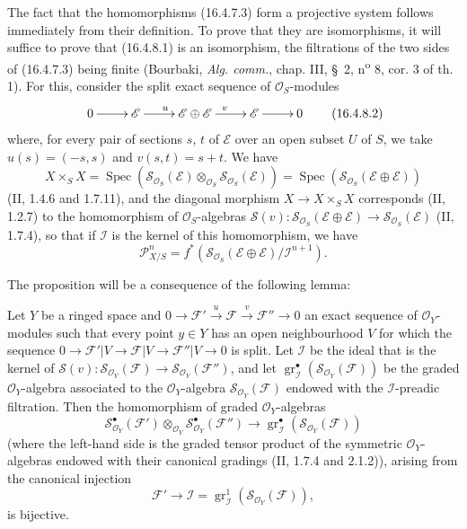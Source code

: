 The fact that the homomorphisms (16.4.7.3) form a projective system follows
immediately from their definition. To prove that they are isomorphisms, it
will suffice to
prove that (16.4.8.1) is an isomorphism, the filtrations of the two sides of
(16.4.7.3) being finite (Bourbaki, \emph{Alg. comm.}, chap. III, \S~2,
n\textsuperscript{o} 8, cor. 3 of th. 1). For this, consider the split exact
sequence of $\mathcal{O}_S$-modules
\[
  \xymatrix{
    0 \ar[r] & \mathscr{E} \ar[r]^{u} &
    \mathscr{E}\oplus\mathscr{E} \ar[r]^{v} &
    \mathscr{E} \ar[r] & 0
  }
  \tag{16.4.8.2}
  \label{IV.16.4.8.2}
\]
where, for every pair of sections $s$, $t$ of $\mathscr{E}$ over an open subset
$U$ of $S$, we take $u(s)=(-s,s)$ and $v(s,t)=s+t$. We have
\[
  X\times_S X=\operatorname{Spec}
  (\mathscr{S}_{\mathcal{O}_S}(\mathscr{E})\otimes_{\mathcal{O}_S}
  \mathscr{S}_{\mathcal{O}_S}(\mathscr{E}))
  =\operatorname{Spec}(\mathscr{S}_{\mathcal{O}_S}
  (\mathscr{E}\oplus\mathscr{E}))
\]
(II, 1.4.6 and 1.7.11), and the diagonal morphism $X\to X\times_S X$ corresponds
(II, 1.2.7) to the homomorphism of $\mathcal{O}_S$-algebras
$\mathscr{S}(v):\mathscr{S}_{\mathcal{O}_S}(\mathscr{E}\oplus\mathscr{E})
\to\mathscr{S}_{\mathcal{O}_S}(\mathscr{E})$ (II, 1.7.4), so that if
$\mathscr{I}$ is the kernel of this homomorphism, we have
\[
  \mathscr{P}_{X/S}^n=f^*(\mathscr{S}_{\mathcal{O}_S}
  (\mathscr{E}\oplus\mathscr{E})/\mathscr{I}^{n+1}).
\]

The proposition will be a consequence of the following lemma:

\begin{lemma}[16.4.8.3]
\label{IV.16.4.8.3}
Let $Y$ be a ringed space and
$0\to\mathscr{F}'\xrightarrow{u}\mathscr{F}\xrightarrow{v}\mathscr{F}''\to0$
an exact sequence of $\mathcal{O}_Y$-modules such that every point $y\in Y$
has an open neighbourhood $V$ for which the sequence
$0\to\mathscr{F}'|V\to\mathscr{F}|V\to\mathscr{F}''|V\to0$ is split.
Let $\mathscr{I}$ be the ideal that is the kernel of
$\mathscr{S}(v):\mathscr{S}_{\mathcal{O}_Y}(\mathscr{F})\to
\mathscr{S}_{\mathcal{O}_Y}(\mathscr{F}'')$, and let
$\operatorname{gr}_{\mathscr{I}}^\bullet
(\mathscr{S}_{\mathcal{O}_Y}(\mathscr{F}))$ be the graded $\mathcal{O}_Y$-algebra
associated to the $\mathcal{O}_Y$-algebra
$\mathscr{S}_{\mathcal{O}_Y}(\mathscr{F})$ endowed with the
$\mathscr{I}$-preadic filtration. Then the homomorphism of graded
$\mathcal{O}_Y$-algebras
\[
  \mathscr{S}_{\mathcal{O}_Y}^{\bullet}(\mathscr{F}')
  \otimes_{\mathcal{O}_Y}
  \mathscr{S}_{\mathcal{O}_Y}^{\bullet}(\mathscr{F}'')
  \longrightarrow
  \operatorname{gr}_{\mathscr{I}}^\bullet
  (\mathscr{S}_{\mathcal{O}_Y}(\mathscr{F}))
  \tag{16.4.8.4}
  \label{IV.16.4.8.4}
\]
(where the left-hand side is the graded tensor product of the symmetric
$\mathcal{O}_Y$-algebras endowed with their canonical gradings
(II, 1.7.4 and 2.1.2)), arising from the canonical injection
\[
  \mathscr{F}'\longrightarrow\mathscr{I}
  =\operatorname{gr}_{\mathscr{I}}^1
  (\mathscr{S}_{\mathcal{O}_Y}(\mathscr{F})),
\]
is bijective.
\end{lemma}

